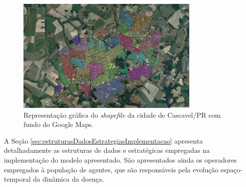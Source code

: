 \begin{figure}[H]
  \centering
  \includegraphics[width=0.8\textwidth]{Figuras/ModelagemAmbiente/Cascavel2.png}
  \caption{Representação gráfica do \textit{shapefile} da cidade de Cascavel/PR com fundo do Google Maps.}
  \label{fig:cascavel2}
\end{figure} 

A Seção \ref{sec:estruturasDadosEstrategiasImplementacao} apresenta detalhadamente as estruturas de dados e estratégicas empregadas na implementação do modelo apresentado. São apresentados ainda os operadores empregados à população de agentes, que são responsáveis pela evolução espaço-temporal da dinâmica da doença.

\newpage